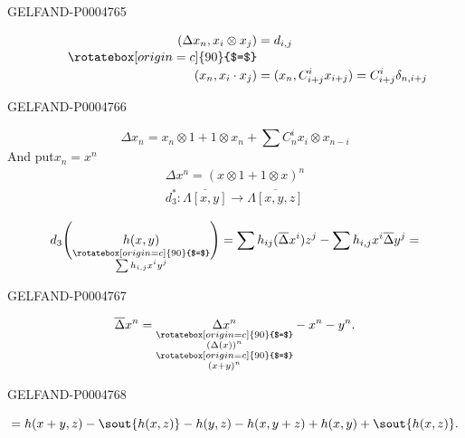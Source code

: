 \begin{GelfandAdjacentEvidence}{GELFAND-P000476}{5}


\[
\begin{aligned}
(\Delta x_n,x_i\otimes x_j)&=d_{i,j}\\[-.4ex]
\qquad\rotatebox[origin=c]{90}{$=$}&\\[-.4ex]
(x_n,x_i\cdot x_j)&=(x_n,C_{i+j}^{i}x_{i+j})=C_{i+j}^{i}\delta_{n,i+j}
\end{aligned}
\]
\end{GelfandAdjacentEvidence}
\begin{GelfandAdjacentEvidence}{GELFAND-P000476}{6}


\[
\Delta x_n=x_n\otimes1+1\otimes x_n+\sum C_n^i x_i\otimes x_{n-i}
\]
And put\quad $x_n=x^n$
\[
\begin{gathered}
\Delta x^n=(x\otimes1+1\otimes x)^n\\
d_3^*\colon \overline{\Lambda[x,y]}\longrightarrow\overline{\Lambda[x,y,z]}
\end{gathered}
\]

\[
d_3\Biggl(\underset{
  \substack{\rotatebox[origin=c]{90}{$=$}\\ \sum h_{i,j}x^iy^j}
}{h(x,y)}\Biggr)=\sum h_{ij}(\overline\Delta x^i)z^j
-\sum h_{i,j}x^i\overline\Delta y^j=
\]
\end{GelfandAdjacentEvidence}
\begin{GelfandAdjacentEvidence}{GELFAND-P000476}{7}


\[
\overline\Delta x^n=
\underset{\substack{
 \rotatebox[origin=c]{90}{$=$}\\
 (\Delta(x))^n\\
 \rotatebox[origin=c]{90}{$=$}\\
 (x+y)^n
}}{\Delta x^n}-x^n-y^n.
\]
\end{GelfandAdjacentEvidence}
\begin{GelfandAdjacentEvidence}{GELFAND-P000476}{8}


\[
=h(x+y,z)-\mbox{\sout{\ensuremath{h(x,z)}}}-h(y,z)
-h(x,y+z)+h(x,y)+\mbox{\sout{\ensuremath{h(x,z)}}}.
\]
\end{GelfandAdjacentEvidence}

